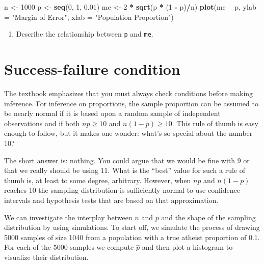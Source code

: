 \documentclass[]{book}
\newenvironment{Shaded}{\begin{snugshade}}{\end{snugshade}}
\newcommand{\KeywordTok}[1]{\textcolor[rgb]{0.13,0.29,0.53}{\textbf{#1}}}
\newcommand{\DataTypeTok}[1]{\textcolor[rgb]{0.13,0.29,0.53}{#1}}
\newcommand{\DecValTok}[1]{\textcolor[rgb]{0.00,0.00,0.81}{#1}}
\newcommand{\FloatTok}[1]{\textcolor[rgb]{0.00,0.00,0.81}{#1}}
\newcommand{\StringTok}[1]{\textcolor[rgb]{0.31,0.60,0.02}{#1}}
\newcommand{\OperatorTok}[1]{\textcolor[rgb]{0.81,0.36,0.00}{\textbf{#1}}}
\newcommand{\NormalTok}[1]{#1}
\providecommand{\tightlist}{%
  \setlength{\itemsep}{0pt}\setlength{\parskip}{0pt}}
\theoremstyle{definition}
\theoremstyle{definition}
\theoremstyle{definition}
\theoremstyle{remark}
\begin{document}
\begin{Shaded}
\begin{Highlighting}[]
\NormalTok{n <-}\StringTok{ }\DecValTok{1000}
\NormalTok{p <-}\StringTok{ }\KeywordTok{seq}\NormalTok{(}\DecValTok{0}\NormalTok{, }\DecValTok{1}\NormalTok{, }\FloatTok{0.01}\NormalTok{)}
\NormalTok{me <-}\StringTok{ }\DecValTok{2} \OperatorTok{*}\StringTok{ }\KeywordTok{sqrt}\NormalTok{(p }\OperatorTok{*}\StringTok{ }\NormalTok{(}\DecValTok{1} \OperatorTok{-}\StringTok{ }\NormalTok{p)}\OperatorTok{/}\NormalTok{n)}
\KeywordTok{plot}\NormalTok{(me }\OperatorTok{~}\StringTok{ }\NormalTok{p, }\DataTypeTok{ylab =} \StringTok{"Margin of Error"}\NormalTok{, }\DataTypeTok{xlab =} \StringTok{"Population Proportion"}\NormalTok{)}
\end{Highlighting}
\end{Shaded}

\begin{enumerate}
\def\labelenumi{\arabic{enumi}.}
\setcounter{enumi}{7}
\tightlist
\item
  Describe the relationship between \texttt{p} and \texttt{me}.
\end{enumerate}

\section{Success-failure condition}\label{success-failure-condition}

The textbook emphasizes that you must always check conditions before
making inference. For inference on proportions, the sample proportion
can be assumed to be nearly normal if it is based upon a random sample
of independent observations and if both \(np \geq 10\) and
\(n(1 - p) \geq 10\). This rule of thumb is easy enough to follow, but
it makes one wonder: what's so special about the number 10?

The short answer is: nothing. You could argue that we would be fine with
9 or that we really should be using 11. What is the ``best'' value for
such a rule of thumb is, at least to some degree, arbitrary. However,
when \(np\) and \(n(1-p)\) reaches 10 the sampling distribution is
sufficiently normal to use confidence intervals and hypothesis tests
that are based on that approximation.

We can investigate the interplay between \(n\) and \(p\) and the shape
of the sampling distribution by using simulations. To start off, we
simulate the process of drawing 5000 samples of size 1040 from a
population with a true atheist proportion of 0.1. For each of the 5000
samples we compute \(\hat{p}\) and then plot a histogram to visualize
their distribution.
\end{document}
